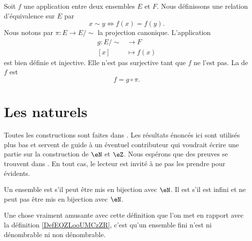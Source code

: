 Soit \( f\) une application entre deux ensembles \( E\) et \( F\). Nous définissons une relation d'équivalence sur \( E\) par
\begin{equation}
    x\sim y\Leftrightarrow f(x)=f(y).
\end{equation}
Nous notons par \( \pi\colon E\to E/\sim\) la projection canonique. L'application
\begin{equation}
    \begin{aligned}
        g\colon E/\sim&\to F \\
        [x]&\mapsto f(x) 
    \end{aligned}
\end{equation}
est bien définie et injective. Elle n'est pas surjective tant que \( f\) ne l'est pas. La  de \( f\) est 
\begin{equation}
    f=g\circ\pi.
\end{equation}

\section{Les naturels}
\label{SECooPJSYooNYaIaq}

Toutes les constructions sont faites dans \cite{RWWJooJdjxEK}. Les résultats énoncés ici sont utilisés plus bas et servent de guide à un éventuel contributeur qui voudrait écrire une partie sur la construction de \( \eN\) et \( \eZ\). Nous espérons que des preuves se trouvent dans \cite{RWWJooJdjxEK}. En tout cas, le lecteur est invité à ne pas les prendre pour évidents.

\begin{definition}
    Un ensemble est  s'il peut être mis en bijection avec \( \eN\). Il est  s'il est infini et ne peut pas être mis en bijection avec \( \eN\).
\end{definition}
Une chose vraiment amusante avec cette définition que l'on met en rapport avec la définition \ref{DefEOZLooUMCzZR}, c'est qu'un ensemble fini n'est ni dénombrable ni non dénombrable.

